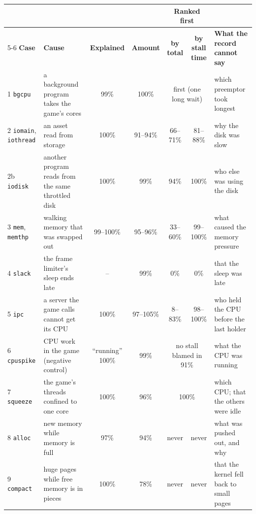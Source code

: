 \setlength{\tabcolsep}{3.5pt}
\begin{tabular}{@{}l>{\raggedright\arraybackslash}p{3.7cm}cccc>{\raggedright\arraybackslash}p{3.4cm}@{}}
\toprule
 & & & & \multicolumn{2}{c}{\textbf{Ranked first}} & \\
\cmidrule(lr){5-6}
\textbf{Case} & \textbf{Cause} & \textbf{Explained} & \textbf{Amount} & \textbf{by total} & \textbf{by stall time} & \textbf{What the record cannot say} \\
\midrule
1 \texttt{bgcpu} & a background program takes the game's cores & 99\% & 100\% & \multicolumn{2}{c}{first (one long wait)} & which preemptor took longest \\
2 \texttt{iomain}, \texttt{iothread} & an asset read from storage & 100\% & 91--94\% & 66--71\% & 81--88\% & why the disk was slow \\
2b \texttt{iodisk} & another program reads from the same throttled disk & 100\% & 99\% & 94\% & 100\% & who else was using the disk \\
3 \texttt{mem}, \texttt{memthp} & walking memory that was swapped out & 99--100\% & 95--96\% & 33--60\% & 99--100\% & what caused the memory pressure \\
4 \texttt{slack} & the frame limiter's sleep ends late & -- & 99\% & 0\% & 0\% & that the sleep was late \\
5 \texttt{ipc} & a server the game calls cannot get its CPU & 100\% & 97--105\% & 8--83\% & 98--100\% & who held the CPU before the last holder \\
6 \texttt{cpuspike} & CPU work in the game (negative control) & ``running'' 100\% & 99\% & \multicolumn{2}{c}{no stall blamed in 91\%} & what the CPU was running \\
7 \texttt{squeeze} & the game's threads confined to one core & 100\% & 96\% & \multicolumn{2}{c}{100\%} & which CPU; that the others were idle \\
8 \texttt{alloc} & new memory while memory is full & 97\% & 94\% & never & never & what was pushed out, and why \\
9 \texttt{compact} & huge pages while free memory is in pieces & 100\% & 78\% & never & never & that the kernel fell back to small pages \\
\bottomrule
\end{tabular}
